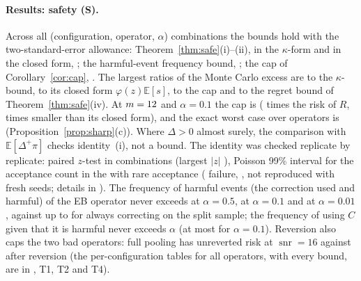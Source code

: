 \documentclass[10pt,a4paper]{article}
\theoremstyle{plain}
\theoremstyle{definition}
\theoremstyle{remark}
\newcommand{\E}{\mathbb{E}}
\DeclareMathOperator{\snr}{snr}
\begin{document}
\paragraph{Results: safety (S).}
Across all \CnConfigs{} (configuration, operator, $\alpha$) combinations the bounds hold with the two-standard-error allowance: Theorem~\ref{thm:safe}(i)--(ii), in the $\kappa$-form and in the closed form, \SafeAll; the harmful-event frequency bound, \SafeHarmAll; the cap of Corollary~\ref{cor:cap}, \SafeUniformAll. The largest ratios of the Monte Carlo excess are \MaxExcessOverKappa{} to the $\kappa$-bound, \MaxExcessOverPhi{} to its closed form $\varphi(z)\E[s]$, \MaxExcessOverUniform{} to the cap and \MaxRegretOverBound{} to the regret bound of Theorem~\ref{thm:safe}(iv). At $m=12$ and $\alpha=0.1$ the cap is \UniformCapTen{} (\UniformCapTenOverRe{} times the risk of $R$, \CapPhiOverCapTen{} times smaller than its closed form), and the exact worst case over operators is \WorstExactTen{} (Proposition~\ref{prop:sharp}(c)). Where $\Delta>0$ almost surely, the comparison with $\E[\Delta^+\pi]$ checks identity~(i), not a bound. The identity was checked replicate by replicate: paired $z$-test in \NIdentityCLT{} combinations (largest $|z|$ \MaxIdentityZ), Poisson 99\% interval for the acceptance count in the \NIdentityPoisson{} with rare acceptance (\NIdentityFail{} failure, \RecheckConfig, not reproduced with \RecheckSeeds{} fresh seeds; details in ). The frequency of harmful events (the correction used and harmful) of the EB operator never exceeds \HarmMaxHalf{} at $\alpha=0.5$, \HarmMaxTen{} at $\alpha=0.1$ and \HarmMaxOne{} at $\alpha=0.01$, against up to \DSixteenAlwaysEHarm{} for always correcting on the split sample; the frequency of using $C$ given that it is harmful never exceeds $\alpha$ (at most \AccHarmMaxTen{} for $\alpha=0.1$). Reversion also caps the two bad operators: full pooling has unreverted risk \SSixteenPoolAlways{} at $\snr=16$ against \SSixteenPoolRevTen{} after reversion (the per-configuration tables for all operators, with every bound, are in , T1, T2 and T4).
\end{document}
